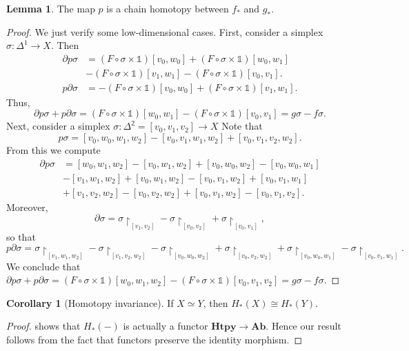 \documentclass[10pt,letterpaper,cm]{nupset}
\theoremstyle{definition}
\theoremstyle{theorem}
\newtheorem{lemma}[definition]{Lemma}
\newtheorem{corollary}[definition]{Corollary}
\theoremstyle{remark}
\newcommand{\1}{\mathbb{1}}
\newcommand{\0}{\vec 0}
\begin{document}
\begin{lemma}\label{l1}
The map $p$ is a chain homotopy between $f_{\ast}$ and $g_{\ast}$. 
\end{lemma}
\begin{proof}
We just verify some low-dimensional cases. First, consider a simplex $\sigma : \Delta^1 \to X$.  Then 
\begin{align*} \partial p \sigma & = \left(F \circ \sigma \times \1\right)[v_0,w_0]  + \left(F \circ \sigma \times \1\right)[w_0, w_1] 
\\ & - \left(F \circ \sigma \times \1\right)[v_1, w_1] - \left(F \circ \sigma \times \1\right)[v_0, v_1].
\\ p \partial \sigma & = {- \left(F \circ \sigma \times \1\right)[v_0, w_0]} + \left(F \circ \sigma \times \1\right)[v_1, w_1]. 
\end{align*}
Thus, 
\[
\partial p \sigma + p \partial \sigma = \left(F \circ \sigma \times \1\right)[w_0, w_1] - \left(F \circ \sigma \times \1\right)[v_0, v_1]= g\sigma - f \sigma.
\] Next, consider a simplex $\sigma : \Delta^2 = [v_0, v_1, v_2] \to X$ Note that
\[
p\sigma = [v_0, w_0, w_1, w_2] - [v_0,v_1, w_1, w_2] + [v_0, v_1, v_2, w_2].
\] From this we compute
\begin{align*}  \partial p \sigma  & = [w_0, w_1, w_2] - [v_0, w_1, w_2] + [v_0, w_0, w_2] - [v_0, w_0, w_1]
\\ & -[v_1, w_1, w_2] +[v_0, w_1, w_2] - [v_0, v_1, w_2] +[v_0, v_1, w_1] 
\\ & + [v_1, v_2, w_2]- [v_0, v_2, w_2] + [v_0, v_1, w_2]- [v_0, v_1, v_2].
\end{align*} 
Moreover,
\[
\partial \sigma = \sigma \restriction_{[v_1, v_2]} -  \sigma \restriction_{[v_0, v_2]} +  \sigma \restriction_{[v_0, v_1]},
\] so that
\[
p \partial \sigma = \sigma \restriction_{[v_1, w_1, w_2]} - \sigma \restriction_{[ v_1, v_2, w_2]} -  \sigma \restriction_{[ v_0, w_0, w_2]} 
+  \sigma \restriction_{[v_0, v_2, w_2 ]} +  \sigma \restriction_{[ v_0, w_0, w_1]} -  \sigma \restriction_{[ v_0, v_1, w_1]}.
\] We conclude that $\partial p \sigma + p \partial \sigma = \left(F \circ \sigma \times \1\right)[w_0, w_1, w_2] - (F \circ \sigma \times \1)[v_0, v_1, v_2] = g \sigma - f \sigma$.
\end{proof}


\begin{corollary}[Homotopy invariance]
If $X \simeq Y$, then $H_{\ast}(X) \cong H_{\ast}(Y)$.
\end{corollary}
\begin{proof}
 shows that $H_{\ast}(-)$ is actually a functor $\mathbf{Htpy} \to  \mathbf{Ab}$. Hence our result follows from the fact that functors preserve the identity morphism. 
\end{proof}
\end{document}

